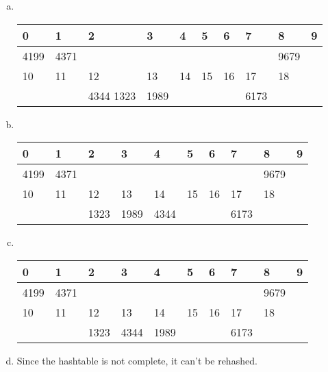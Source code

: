 \documentclass{article}
\begin{document}
\section{}
\begin{enumerate}[(a)]
\item \ 
\begin{center}
\begin{tabular}{|m{2em}<{\centering}|m{2em}<{\centering}|m{2em}<{\centering}|m{2em}<{\centering}|m{2em}<{\centering}|m{2em}<{\centering}|m{2em}<{\centering}|m{2em}<{\centering}|m{2em}<{\centering}|m{2em}<{\centering}|}
\hline
0 & 1 & 2 & 3 & 4 & 5 & 6 & 7 & 8 & 9 \\\hline
4199 & 4371 &&&&&&& 9679 & \\\hline
10 & 11 & 12 & 13 & 14 & 15 & 16 & 17 & 18 & \\\hline
& & 4344 1323 & 1989 & & & & 6173 & & \\\hline
\end{tabular}
\end{center}
\item \ 
\begin{center}
\begin{tabular}{|m{2em}<{\centering}|m{2em}<{\centering}|m{2em}<{\centering}|m{2em}<{\centering}|m{2em}<{\centering}|m{2em}<{\centering}|m{2em}<{\centering}|m{2em}<{\centering}|m{2em}<{\centering}|m{2em}<{\centering}|}
\hline
0 & 1 & 2 & 3 & 4 & 5 & 6 & 7 & 8 & 9 \\\hline
4199 & 4371 &&&&&&& 9679 & \\\hline
10 & 11 & 12 & 13 & 14 & 15 & 16 & 17 & 18 & \\\hline
& & 1323 & 1989 & 4344 & & & 6173 & & \\\hline
\end{tabular}
\end{center}
\item \ 
\begin{center}
\begin{tabular}{|m{2em}<{\centering}|m{2em}<{\centering}|m{2em}<{\centering}|m{2em}<{\centering}|m{2em}<{\centering}|m{2em}<{\centering}|m{2em}<{\centering}|m{2em}<{\centering}|m{2em}<{\centering}|m{2em}<{\centering}|}
\hline
0 & 1 & 2 & 3 & 4 & 5 & 6 & 7 & 8 & 9 \\\hline
4199 & 4371 &&&&&&& 9679 & \\\hline
10 & 11 & 12 & 13 & 14 & 15 & 16 & 17 & 18 & \\\hline
& & 1323 & 4344 & 1989 & & & 6173 & & \\\hline
\end{tabular}
\end{center}
\item
Since the hashtable is not complete, it can't be rehashed.
\end{enumerate}
\end{document}
